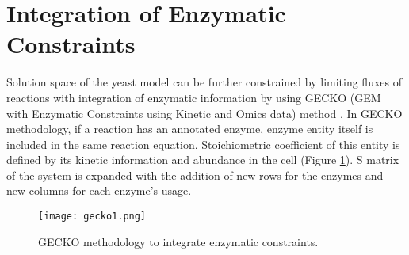 \section{Integration of Enzymatic Constraints}

  Solution space of the yeast model can be further constrained by limiting fluxes of reactions with integration of enzymatic information by using GECKO (GEM with Enzymatic Constraints using Kinetic and Omics data) method \cite{sanchez2017improving}.  In GECKO methodology, if a reaction has an annotated enzyme, enzyme entity itself is included in the same reaction equation. Stoichiometric coefficient of this entity is defined by its kinetic information and abundance in the cell (Figure \ref{fig:gecko1}). S matrix of the system is expanded with the addition of new rows for the enzymes and new columns for each enzyme's usage.

\begin{figure}[H]
\begin{center}
\texttt{[image: gecko1.png]}
\end{center}
\caption[GECKO methodology to integrate enzymatic constraints\cite{sanchez2017improving}]{GECKO methodology to integrate enzymatic constraints\cite{sanchez2017improving}.}
\label{fig:gecko1}
\end{figure}

